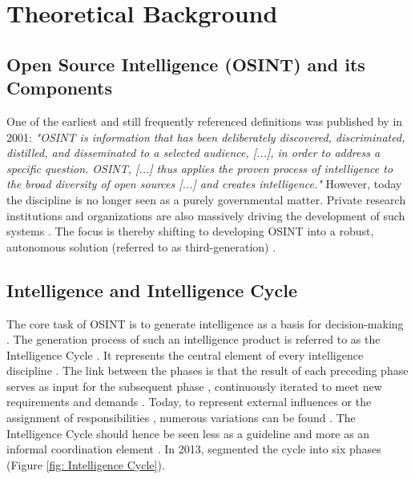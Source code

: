 \documentclass[10pt]{article}
\begin{document}
\section{Theoretical Background} \label{sec:theoreticalbackground}


\subsection{Open Source Intelligence (OSINT) and its Components}

One of the earliest and still frequently referenced definitions \cite{DosPassos.2017}
was published by \cite{NorthAtlanticTreatyOrganization.2001} in 2001: \textit{"OSINT is information that has been
    deliberately discovered, discriminated, distilled, and disseminated to a selected audience,
    [...], in order to address a specific question. OSINT, [...] thus applies the proven
    process of intelligence to the broad diversity of open sources [...] and creates
    intelligence."} However, today the discipline is no longer seen as a purely governmental
matter. Private research institutions and organizations \cite{Bohm.2021,Mercado.2005} are
also massively driving the development of such systems
\cite{Dokman.2020, Ghioni.2023}. The focus is thereby shifting to
developing OSINT into a robust, autonomous solution (referred to as third-generation) \cite{PastorGalindo.2019}.

\subsection{Intelligence and Intelligence Cycle}

The core task of OSINT is to generate intelligence as a basis for decision-making
\cite{Breakspear.2013,NorthAtlanticTreatyOrganization.2001}. The generation process of such an intelligence product
is referred to as the Intelligence Cycle \cite{CentralIntelligenceAgency.1987}.
It represents the central element of every intelligence discipline \cite{Reuser.2017}.
The link between the phases is that the result of each preceding phase serves as input for the subsequent phase \cite{JointChiefsofStaffU.S.Army.2013}, continuously iterated to meet new requirements and demands \cite{Gibson.2016}.
Today, to represent external influences or the assignment of responsibilities \cite{Lowenthal.2020,Phythian.2013}, numerous
variations can be found \cite{Reuser.2017}. The Intelligence Cycle should hence be seen less as a guideline and more as an informal
coordination element \cite{Hwang.2022}. In 2013, \cite{JointChiefsofStaffU.S.Army.2013} segmented the cycle into six phases  (Figure \ref{fig: Intelligence Cycle}).
\end{document}
